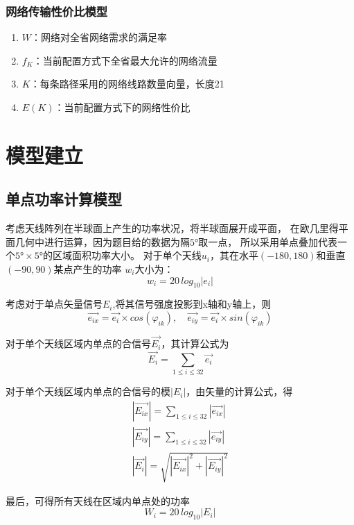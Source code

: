 \documentclass[UTF8,12pt]{ctexart}
\begin{document}
      \subsubsection{网络传输性价比模型}
        \begin{enumerate}
            \item $W$：网络对全省网络需求的满足率
            \item $f_K$：当前配置方式下全省最大允许的网络流量
            \item $K$：每条路径采用的网络线路数量向量，长度21
            \item $E(K)$：当前配置方式下的网络性价比
        \end{enumerate}

\newpage

\section{模型建立}
    \subsection{单点功率计算模型}
    考虑天线阵列在半球面上产生的功率状况，将半球面展开成平面，
    在欧几里得平面几何中进行运算，因为题目给的数据为隔$5°$取一点，
    所以采用单点叠加代表一个$5°×5°$的区域面积功率大小。
    对于单个天线$u_i$，其在水平$(-180,180)$和垂直$(-90,90)$某点产生的功率
    $w_i$大小为：$$w_i = 20\, log_{10}{|e_i|}$$\par
    
    考虑对于单点矢量信号$E_i$,将其信号强度投影到x轴和y轴上，则
    $$\vec{e_{ix}} = \vec{e_{i}}×cos(\varphi_{ik}), \quad 
    \vec{e_{iy}} = \vec{e_{i}}×sin(\varphi_{ik})$$\par
    
    对于单个天线区域内单点的合信号$\vec{E_{i}}$，其计算公式为
    $$\vec{E_{i}}=\sum_{1\leqslant i \leqslant 32} \vec{e_{i}}$$\par
    
    对于单个天线区域内单点的合信号的模$|E_i|$，由矢量的计算公式，得
    \begin{gather*}
        |\vec {E_{ix}}| = \sum_{1\le i \le 32} |\vec {e_{ix}}|\\
        |\vec {E_{iy}}| = \sum_{1\le i \le 32} |\vec {e_{iy}}|\\
        |\vec {E_i}| = \sqrt{|\vec {E_{ix}}|^{2}+|\vec {E_{iy}}|^{2}}
    \end{gather*}\par
    最后，可得所有天线在区域内单点处的功率
    $$W_i = 20\, log_{10}{|E_i|}$$
\end{document}
